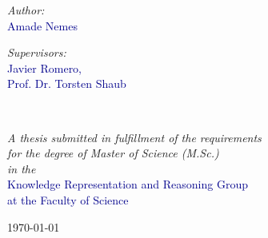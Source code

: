 \begin{titlepage}
\begin{center}
    \vspace*{.005\textheight}
    \begin{minipage}[t]{0.4\textwidth}
    \begin{flushleft} \large
    \emph{Author:}\\
    {\textcolor{darkblue}{Amade Nemes}}\\
    \end{flushleft}
    \end{minipage}
    \begin{minipage}[t]{0.4\textwidth}
    \begin{flushright} \large
    \emph{Supervisors:} \\
    {\textcolor{darkblue}{Javier Romero, \\Prof. Dr. Torsten Shaub}}
    \end{flushright}
    \end{minipage}\\[2.3cm]
     
    \vfill
    
    \large \textit{A thesis submitted in fulfillment of the requirements\\ for the degree of Master of Science (M.Sc.)}\\[0.3cm]
    \textit{in the}\\[0.4cm]
    \textcolor{darkblue}{Knowledge Representation and Reasoning Group \\ at the Faculty of Science } \\[1cm]
     
    \vfill
    
    {\large \today}\\[4cm]
     
    \vfill
    \end{center}
    \end{titlepage}